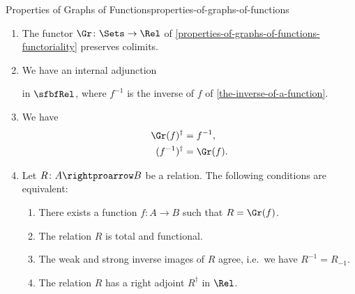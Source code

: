 \begin{proposition}{Properties of Graphs of Functions}{properties-of-graphs-of-functions}
\begin{enumerate}
            \begin{webcompile}
                \Adjunction#\Gr#_{!}#\Sets#\Rel,#
            \end{webcompile}%
            witnessed by a bijection of sets%
            \[
                \Rel(\Gr(A),B)
                \cong
                \Sets(A,\mathcal{P}(B))
            \]%
            natural in $A\in\Obj(\Sets)$ and $B\in\Obj(\Rel)$.
        \item\label{properties-of-graphs-of-functions-cocontinuity}The functor $\Gr\colon\Sets\to\Rel$ of \cref{properties-of-graphs-of-functions-functoriality} preserves colimits.
        \item\label{properties-of-graphs-of-functions-adjointness-inside-sfbfrel}We have an internal adjunction
            in $\sfbfRel$, where $f^{-1}$ is the inverse of $f$ of \cref{the-inverse-of-a-function}.
        \item\label{properties-of-graphs-of-functions-interaction-with-converses}We have
            \begin{align*}
                \Gr(f)^{\dagger}   &= f^{-1},\\
                (f^{-1})^{\dagger} &= \Gr(f).
            \end{align*}
        \item\label{properties-of-graphs-of-functions-characterisations}Let $R\colon A\rightproarrow B$ be a relation. The following conditions are equivalent:
            \begin{enumerate}
                \item\label{properties-of-graphs-of-functions-characterisations-1}There exists a function $f\colon A\to B$ such that $R=\Gr(f)$.
                \item\label{properties-of-graphs-of-functions-characterisations-2}The relation $R$ is total and functional.
                \item\label{properties-of-graphs-of-functions-characterisations-3}The weak and strong inverse images of $R$ agree, i.e.\ we have $R^{-1}=R_{-1}$.
                \item\label{properties-of-graphs-of-functions-characterisations-4}The relation $R$ has a right adjoint $R^{\dagger}$ in $\Rel$.
            \end{enumerate}
    \end{enumerate}
\end{proposition}
